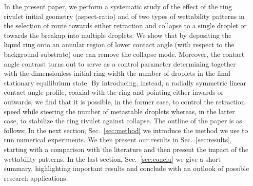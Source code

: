\documentclass[%
 aip,
 amsmath,amssymb,
 reprint,%
]{revtex4-1}
\begin{document}
In the present paper, we perform a systematic study of the effect of the ring rivulet initial geometry (aspect-ratio) and of two types of wettability patterns in the selection of route towards either retraction and collapse to a single droplet or towards the breakup into multiple droplets. 
We show that by depositing the liquid ring onto an annular region of lower contact angle (with respect to the background substrate) one can remove the collapse mode. 
Moreover, the contact angle contrast turns out to serve as a control parameter determining together with the dimensionless initial ring width the number of droplets in the final stationary equilibrium state.
By introducing, instead, a radially symmetric linear contact angle profile, coaxial with the ring and pointing either inwards or outwards, we find that it is possible, in the former case, to control the retraction speed while steering the number of metastable droplets whereas, in the latter case, to stabilize the ring rivulet against collapse.
The outline of the paper is as follows: In the next section, Sec.~\ref{sec:method} we introduce the method we use to run numerical experiments.
We then present our results in Sec.~\ref{sec:results}, starting with a comparison with the literature and then present the impact of the wettability patterns.
In the last section, Sec.~\ref{sec:conclu} we give a short summary, highlighting important results and conclude with an outlook of possible research applications.
\end{document}
